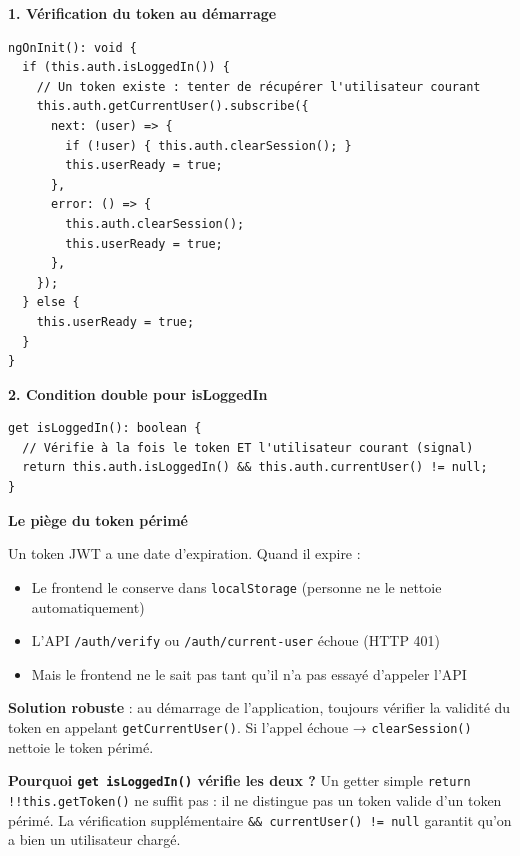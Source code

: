 \documentclass[a4paper,12pt,french]{article}
\begin{document}
\begin{solutionbox}
\textbf{1. Vérification du token au démarrage}

\begin{lstlisting}[style=tsstyle]
ngOnInit(): void {
  if (this.auth.isLoggedIn()) {
    // Un token existe : tenter de récupérer l'utilisateur courant
    this.auth.getCurrentUser().subscribe({
      next: (user) => {
        if (!user) { this.auth.clearSession(); }
        this.userReady = true;
      },
      error: () => {
        this.auth.clearSession();
        this.userReady = true;
      },
    });
  } else {
    this.userReady = true;
  }
}
\end{lstlisting}

\textbf{2. Condition double pour isLoggedIn}

\begin{lstlisting}[style=tsstyle]
get isLoggedIn(): boolean {
  // Vérifie à la fois le token ET l'utilisateur courant (signal)
  return this.auth.isLoggedIn() && this.auth.currentUser() != null;
}
\end{lstlisting}
\end{solutionbox}

\begin{lessonbox}
\textbf{Le piège du token périmé}

Un token JWT a une date d'expiration. Quand il expire :
\begin{itemize}
    \item Le frontend le conserve dans \texttt{localStorage} (personne ne le nettoie automatiquement)
    \item L'API \texttt{/auth/verify} ou \texttt{/auth/current-user} échoue (HTTP 401)
    \item Mais le frontend ne le sait pas tant qu'il n'a pas essayé d'appeler l'API
\end{itemize}

\textbf{Solution robuste} : au démarrage de l'application, toujours vérifier la validité du token en appelant \texttt{getCurrentUser()}. Si l'appel échoue → \texttt{clearSession()} nettoie le token périmé.

\textbf{Pourquoi \texttt{get isLoggedIn()} vérifie les deux ?} Un getter simple \texttt{return !!this.getToken()} ne suffit pas : il ne distingue pas un token valide d'un token périmé. La vérification supplémentaire \texttt{\&\& currentUser() != null} garantit qu'on a bien un utilisateur chargé.
\end{lessonbox}

\newpage
\end{document}
